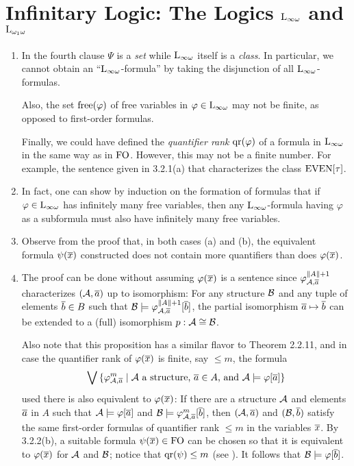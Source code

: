 \section{Infinitary Logic: The Logics $\inflog$ and $\dlog{\omega_1}$}
\begin{enumerate}[1.]
%
\item {} In the fourth clause $\Psi$ is a \emph{set} while $\inflog$ itself is a \emph{class}. In particular, we cannot obtain an ``$\inflog$-formula'' by taking the disjunction of all $\inflog$-formulas.

Also, the set $\mathrm{free}(\varphi)$ of free variables in $\varphi \in \inflog$ may not be finite, as opposed to first-order formulas.

Finally, we could have defined the \emph{quantifier rank} $\mathrm{qr}(\varphi)$ of a formula in $\inflog$ in the same way as in $\folog$. However, this may not be a finite number. For example, the sentence given in 3.2.1(a) that characterizes the class $\mathrm{EVEN}{[\tau]}$.
%
\item {} In fact, one can show by induction on the formation of formulas that if $\varphi \in \inflog$ has infinitely many free variables, then any $\inflog$-formula having $\varphi$ as a subformula must also have infinitely many free variables.
%
\item {} Observe from the proof that, in both cases (a) and (b), the equivalent formula $\psi(\overline{x})$ constructed does not contain more quantifiers than does $\varphi(\overline{x})$.
%
\item {} The proof can be done without assuming $\varphi(\overline{x})$ is a sentence since $\varphi^{\|A\| + 1}_{\mathcal{A}, \overline{a}}$ characterizes $(\mathcal{A}, \overline{a})$ up to isomorphism: For any structure $\mathcal{B}$ and any tuple of elements $\overline{b} \in B$ such that $\mathcal{B} \models \varphi^{\|A\| + 1}_{\mathcal{A}, \overline{a}}[\overline{b}]$, the partial isomorphism $\overline{a} \mapsto \overline{b}$ can be extended to a (full) isomorphism $p: \strct{A} \isom \strct{B}$.

Also note that this proposition has a similar flavor to Theorem 2.2.11, and in case the quantifier rank of $\varphi(\overline{x})$ is finite, say $\leq m$, the formula
\[
\blor \sett{\hint{m}{\strct{A}, \vect{a}}}{\mathmode{\strct{A}} a structure, \mathmode{\vect{a} \in A}, and \mathmode{\strct{A} \satis \varphi[\vect{a}]}}
\]
used there is also equivalent to $\varphi(\overline{x})$: If there are a structure $\mathcal{A}$ and elements $\overline{a}$ in $A$ such that $\mathcal{A} \models \varphi[\overline{a}]$ and $\mathcal{B} \models \varphi^{m}_{\mathcal{A}, \overline{a}}[\overline{b}]$, then $(\mathcal{A}, \overline{a})$ and $(\mathcal{B}, \overline{b})$ satisfy the same first-order formulas of quantifier rank $\leq m$ in the variables $\overline{x}$. By 3.2.2(b), a suitable formula $\psi(\vect{x}) \in \folog$ can be chosen so that it is equivalent to $\varphi(\overline{x})$ for $\mathcal{A}$ and $\mathcal{B}$; notice that $\mathrm{qr}(\psi) \leq m$ (see ). It follows that $\mathcal{B} \models \varphi[\overline{b}]$.


\end{enumerate}
